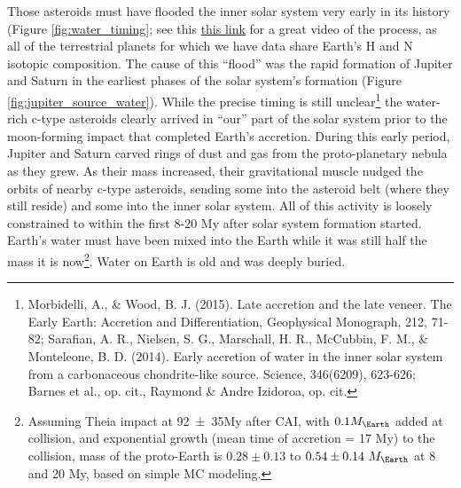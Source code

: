 {Those asteroids must have flooded the inner solar system very early in its history (Figure \ref{fig:water_timing}; see this \href{https://www.youtube.com/watch?v=Ji5ZC7CP5to}{this link} for a great video of the process, as all of the terrestrial planets for which we have data share Earth's H and N isotopic composition. The cause of this ``flood'' was the rapid formation of Jupiter and Saturn in the earliest phases of the solar system's formation (Figure \ref{fig:jupiter_source_water}). While the precise timing is still unclear\footnote{Morbidelli, A., \& Wood, B. J. (2015). Late accretion and the late veneer. The Early Earth: Accretion and Differentiation, Geophysical Monograph, 212, 71-82; Sarafian, A. R., Nielsen, S. G., Marschall, H. R., McCubbin, F. M., \& Monteleone, B. D. (2014). Early accretion of water in the inner solar system from a carbonaceous chondrite-like source. Science, 346(6209), 623-626; Barnes et al., op. cit., Raymond \& Andre Izidoroa, op. cit.} the water-rich c-type asteroids clearly arrived in ``our'' part of the solar system prior to the moon-forming impact that completed Earth's accretion. During this early period, Jupiter and Saturn carved rings of dust and gas from the proto-planetary nebula as they grew. As their mass increased, their gravitational muscle nudged the orbits of nearby c-type asteroids, sending some into the asteroid belt (where they still reside) and some into the inner solar system. All of this activity is loosely constrained to within the first 8-20 My after solar system formation started. Earth's water must have been mixed into the Earth while it was still half the mass it is now\footnote{Assuming Theia impact at \num[separate-uncertainty = true]{92(35)}My after CAI, with $0.1M_\Earth$ added at collision, and exponential growth (mean time of accretion = 17 My) to the collision, mass of the proto-Earth is $0.28\pm 0.13$ to $0.54\pm 0.14\  M_\Earth$ at 8 and 20 My, based on simple MC modeling.}. Water on Earth is old and was deeply buried.\\
 
  
}
